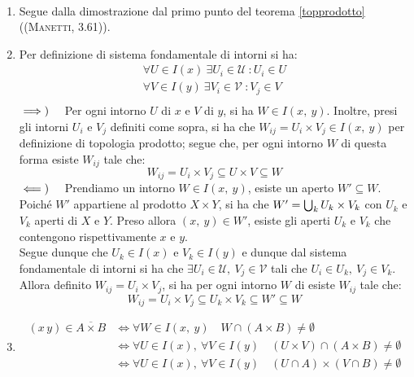 \begin{demonstration}~{}
	\begin{enumerate}[label=\Roman*]
		\item Segue dalla dimostrazione dal primo punto del teorema \ref{topprodotto} (\textsc{(Manetti, 3.61)}).
		\item Per definizione di sistema fondamentale di intorni si ha:
		\begin{gather*}
			\forall U\in I\left(x\right)\ \exists U_i\in\mathcal{U}\ \colon U_i\in U\\
			\forall V\in I\left(y\right)\ \exists V_i\in\mathcal{V}\ \colon V_j\in V\\
		\end{gather*}
		$\implies)\quad$ Per ogni intorno $U$ di $x$ e $V$ di $y$, si ha $W\in I\left(x,\ y\right)$. Inoltre, presi gli intorni $U_i$ e $V_j$ definiti come sopra, si ha che $W_{ij} = U_i \times V_j\in I\left(x,\ y\right)$ per definizione di topologia prodotto; segue che, per ogni intorno $W$ di questa forma esiste $W_{ij}$ tale che:
		\begin{equation*}
			W_{ij} = U_i \times V_j\subseteq U\times V\subseteq W
		\end{equation*}
		$\impliedby)\quad$ Prendiamo un intorno $W\in I\left(x,\ y\right)$, esiste un aperto $W'\subseteq W$. Poiché $W'$ appartiene al prodotto $X\times Y$, si ha che $W'=\mathop{{\bigcup}}\displaylimits_k U_k\times V_k$ con $U_k$ e $V_k$ aperti di $X$ e $Y$. Preso allora $\left(x,\ y\right)\in W'$, esiste gli aperti $U_k$ e $V_k$ che contengono rispettivamente $x$ e $y$.\\
		Segue dunque che $U_k\in I\left(x\right)$ e $V_k\in I\left(y\right)$ e dunque dal sistema fondamentale di intorni si ha che $\exists U_i\in\mathcal{U},\ V_j\in\mathcal{V}$ tali che $U_i\in U_k,\  V_j\in V_k$. Allora definito $W_{ij} = U_i \times V_j$, si ha per ogni intorno $W$ di esiste $W_{ij}$ tale che:
		\begin{equation*}
			W_{ij} = U_i \times V_j\subseteq U_k\times V_k\subseteq W'\subseteq W
		\end{equation*}
		\item \begin{align*}
			\left(x\, y\right)\in \overline{A\times B}&\iff \forall W\in I\left(x,\ y\right)\quad W\cap\left(A\times B\right)\neq \emptyset\\
			&\iff \forall U\in I\left(x\right),\ \forall V\in I\left(y\right)\quad \left(U\times V\right)\cap\left(A\times B\right)\neq \emptyset\\
			&\iff \forall U\in I\left(x\right),\ \forall V\in I\left(y\right)\quad \left(U\cap A\right)\times\left(V\cap B\right)\neq \emptyset\\

\end{align*}
\end{enumerate}
\end{demonstration}
